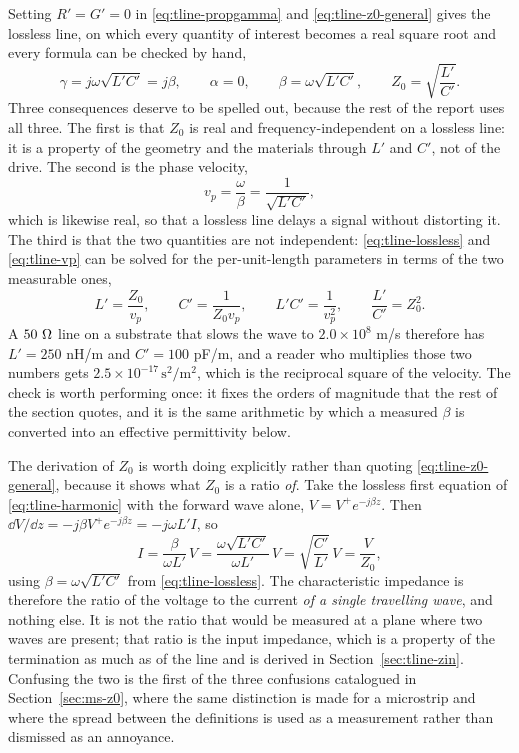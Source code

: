 Setting $R' = G' = 0$ in \eqref{eq:tline-propgamma} and \eqref{eq:tline-z0-general} gives the lossless line, on
which every quantity of interest becomes a real square root and every formula can be checked by hand,
\begin{equation}
  \gamma = j\omega\sqrt{L'C'} = j\beta, \qquad
  \alpha = 0, \qquad
  \beta = \omega\sqrt{L'C'}, \qquad
  Z_0 = \sqrt{\frac{L'}{C'}} .
  \label{eq:tline-lossless}
\end{equation}
Three consequences deserve to be spelled out, because the rest of the report uses all three. The first is that
$Z_0$ is real and frequency-independent on a lossless line: it is a property of the geometry and the materials
through $L'$ and $C'$, not of the drive. The second is the phase velocity,
\begin{equation}
  v_p = \frac{\omega}{\beta} = \frac{1}{\sqrt{L'C'}},
  \label{eq:tline-vp}
\end{equation}
which is likewise real, so that a lossless line delays a signal without distorting it. The third is that the
two quantities are not independent: \eqref{eq:tline-lossless} and \eqref{eq:tline-vp} can be solved for the
per-unit-length parameters in terms of the two measurable ones,
\begin{equation}
  L' = \frac{Z_0}{v_p}, \qquad C' = \frac{1}{Z_0 v_p}, \qquad L'C' = \frac{1}{v_p^{2}}, \qquad
  \frac{L'}{C'} = Z_0^{2} .
  \label{eq:tline-lc}
\end{equation}
A $50\ \Omega$ line on a substrate that slows the wave to $2.0\times10^{8}$ m/s therefore has
$L' = 250$ nH/m and $C' = 100$ pF/m, and a reader who multiplies those two numbers gets
$2.5\times10^{-17}\,\mathrm{s}^2/\mathrm{m}^2$, which is the reciprocal square of the velocity. The check is
worth performing once: it fixes the orders of magnitude that the rest of the section quotes, and it is the same
arithmetic by which a measured $\beta$ is converted into an effective permittivity below.

The derivation of $Z_0$ is worth doing explicitly rather than quoting \eqref{eq:tline-z0-general}, because it
shows what $Z_0$ is a ratio \emph{of}. Take the lossless first equation of \eqref{eq:tline-harmonic} with the
forward wave alone, $V = V^{+}e^{-j\beta z}$. Then $\dd V/\dd z = -j\beta V^{+}e^{-j\beta z} = -j\omega L' I$,
so
\begin{equation}
  I = \frac{\beta}{\omega L'}\,V = \frac{\omega\sqrt{L'C'}}{\omega L'}\,V
    = \sqrt{\frac{C'}{L'}}\,V = \frac{V}{Z_0},
  \label{eq:tline-z0-derivation}
\end{equation}
using $\beta = \omega\sqrt{L'C'}$ from \eqref{eq:tline-lossless}. The characteristic impedance is therefore the
ratio of the voltage to the current \emph{of a single travelling wave}, and nothing else. It is not the ratio
that would be measured at a plane where two waves are present; that ratio is the input impedance, which is a
property of the termination as much as of the line and is derived in Section~\ref{sec:tline-zin}. Confusing the
two is the first of the three confusions catalogued in Section~\ref{sec:ms-z0}, where the same distinction is
made for a microstrip and where the spread between the definitions is used as a measurement rather than
dismissed as an annoyance.


